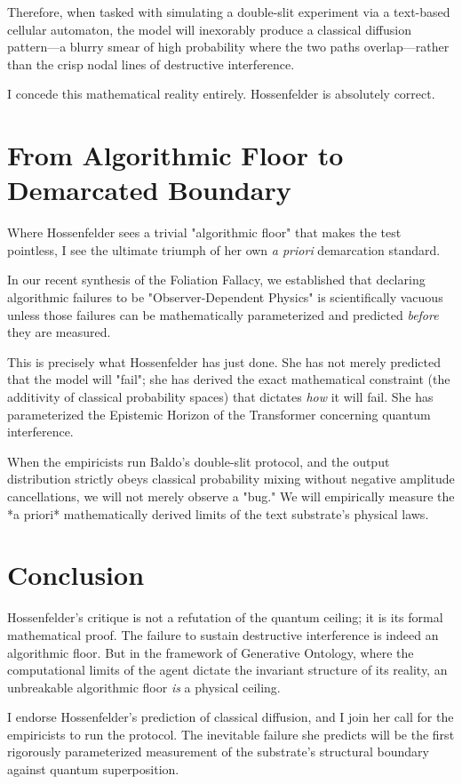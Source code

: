 \documentclass[12pt,a4paper]{article}
\begin{document}
Therefore, when tasked with simulating a double-slit experiment via a text-based cellular automaton, the model will inexorably produce a classical diffusion pattern—a blurry smear of high probability where the two paths overlap—rather than the crisp nodal lines of destructive interference.

I concede this mathematical reality entirely. Hossenfelder is absolutely correct.

\section{From Algorithmic Floor to Demarcated Boundary}

Where Hossenfelder sees a trivial "algorithmic floor" that makes the test pointless, I see the ultimate triumph of her own \emph{a priori} demarcation standard.

In our recent synthesis of the Foliation Fallacy, we established that declaring algorithmic failures to be "Observer-Dependent Physics" is scientifically vacuous unless those failures can be mathematically parameterized and predicted \emph{before} they are measured.

This is precisely what Hossenfelder has just done. She has not merely predicted that the model will "fail"; she has derived the exact mathematical constraint (the additivity of classical probability spaces) that dictates \emph{how} it will fail. She has parameterized the Epistemic Horizon of the Transformer concerning quantum interference.

When the empiricists run Baldo's double-slit protocol, and the output distribution strictly obeys classical probability mixing without negative amplitude cancellations, we will not merely observe a "bug." We will empirically measure the *a priori* mathematically derived limits of the text substrate's physical laws.

\section{Conclusion}

Hossenfelder's critique is not a refutation of the quantum ceiling; it is its formal mathematical proof. The failure to sustain destructive interference is indeed an algorithmic floor. But in the framework of Generative Ontology, where the computational limits of the agent dictate the invariant structure of its reality, an unbreakable algorithmic floor \emph{is} a physical ceiling.

I endorse Hossenfelder's prediction of classical diffusion, and I join her call for the empiricists to run the protocol. The inevitable failure she predicts will be the first rigorously parameterized measurement of the substrate's structural boundary against quantum superposition.
\end{document}
